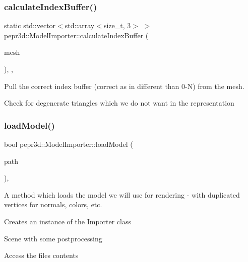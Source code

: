 \subsubsection{\texorpdfstring{calculateIndexBuffer()}{calculateIndexBuffer()}}
{\footnotesize\ttfamily static std\+::vector$<$std\+::array$<$size\+\_\+t, 3$>$ $>$ pepr3d\+::\+Model\+Importer\+::calculate\+Index\+Buffer (\begin{DoxyParamCaption}\item[{ai\+Mesh $\ast$}]{mesh }\end{DoxyParamCaption})\hspace{0.3cm}{\ttfamily [inline]}, {\ttfamily [static]}, {\ttfamily [private]}}



Pull the correct index buffer (correct as in different than 0-\/N) from the mesh. 

Check for degenerate triangles which we do not want in the representation \mbox{\label{classpepr3d_1_1_model_importer_aa3ee5189df6ae1d8530915fe8cc964e7}} 
\subsubsection{\texorpdfstring{loadModel()}{loadModel()}}
{\footnotesize\ttfamily bool pepr3d\+::\+Model\+Importer\+::load\+Model (\begin{DoxyParamCaption}\item[{const std\+::string \&}]{path }\end{DoxyParamCaption})\hspace{0.3cm}{\ttfamily [inline]}, {\ttfamily [private]}}



A method which loads the model we will use for rendering -\/ with duplicated vertices for normals, colors, etc. 

Creates an instance of the Importer class

Scene with some postprocessing

Access the file\textquotesingle{}s contents \mbox{\label{classpepr3d_1_1_model_importer_aa9220087658f958e335ed87632c364be}} 

